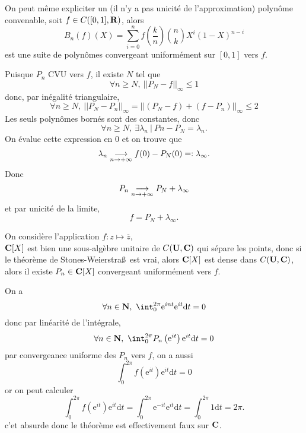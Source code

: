\documentclass[a4paper,11pt, twoside]{article}
\begin{document}
On peut même expliciter un (il n'y a pas unicité de l'approximation) polynôme convenable, soit $f\in C([0,1],\mathbf R)$, alors 
$$B_n(f)(X)=\sum_{i=0}^nf\left(\frac{k}{n}\right)\binom{n}{k}X^i(1-X)^{n-i}$$
est une suite de polynômes convergeant uniformément sur $[0,1]$ vers $f$.\\[1em]




\begin{Proof}
  Puisque $P_n$ CVU vers $f$, il existe $N$ tel que 
  $$\forall n\geqslant N,\ ||P_N-f||_{\infty}\leqslant 1$$
  donc, par inégalité triangulaire,
  $$\forall n\geqslant N,\ ||P_N-P_n||_{\infty}=||(P_N-f)+(f-P_n)||_{\infty}\leqslant 2$$
  Les seuls polynômes bornés sont des constantes, donc 
  $$\forall n\geqslant N,\ \exists \lambda_n\ |\ Pn-P_N=\lambda_n.$$
  On évalue cette expression en 0 et on trouve que 
  $$\lambda_n \underset{n\to+\infty}{\longrightarrow} f(0) - P_N(0)=:\lambda_{\infty}.$$
  Donc $$P_n\underset{n\to+\infty}{\longrightarrow} P_N + \lambda_{\infty}$$
  et par unicité de la limite, 
  $$f=P_N+\lambda_{\infty}.$$
\end{Proof}




\begin{Proof}
  On considère l'application $f:z\longmapsto \overline z$,\\
  $\mathbf C[X]$ est bien une sous-algèbre unitaire de $C(\mathbf U,\mathbf C)$ qui sépare les points, donc si le théorème de Stones-Weierstra\ss\ est vrai, alors $\mathbf C[X]$ est dense dans $C(\mathbf U,\mathbf C)$, alors il existe $P_n\in\mathbf C[X]$ convergeant uniformément vers $f$.

  On a 
  $$\forall n\in\N,\ \int_0^{2\pi}\mathrm e^{int}\mathrm e^{it}\mathrm dt=0$$
  donc par linéarité de l'intégrale,
  $$\forall n\in\N,\ \int_0^{2\pi}P_n\left(\mathrm e^{it}\right)\mathrm e^{it}\mathrm dt=0$$
  par convergeance uniforme des $P_n$ vers $f$, on a aussi
  $$\int_0^{2\pi}f\left(\mathrm e^{it}\right)\mathrm e^{it}\mathrm dt=0$$
  or on peut calculer
  $$\int_0^{2\pi}f\left(\mathrm e^{it}\right)\mathrm e^{it}\mathrm dt=\int_0^{2\pi}\mathrm e^{-it}\mathrm e^{it}\mathrm dt=\int_0^{2\pi}1\mathrm dt=2\pi.$$
  c'et absurde donc le théorème est effectivement faux sur $\mathbf C$.
\end{Proof}
\end{document}
